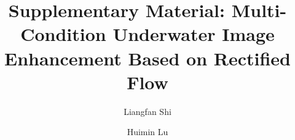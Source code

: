 \documentclass[runningheads]{llncs}
\begin{document}
\title{Supplementary Material: Multi-Condition Underwater Image Enhancement Based on Rectified Flow}

\author{Liangfan Shi \and Huimin Lu}


\maketitle





\end{document}
